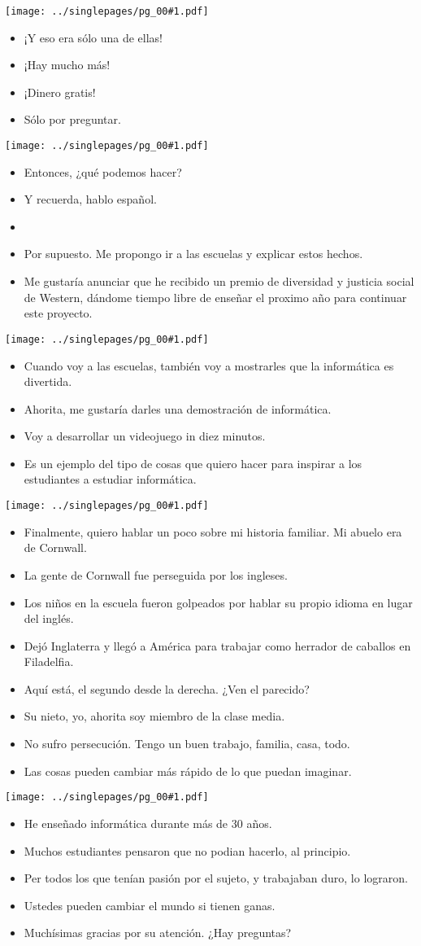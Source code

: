 \documentclass[12pt]{article}
\newcommand{\bi}{\begin{itemize}}
\newcommand{\ei}{\end{itemize}}
\newcommand{\cue}{\mbox{}
  \fbox{\sf Next slide}
}
\newcommand{\fig}[1]{
  \newpage  
  \begin{center}
    \texttt{[image: ../singlepages/pg\_00\#1.pdf]}
  \end{center}
  
}
\begin{document}
\fig{18}

\bi
\item
  ¡Y eso era sólo una de ellas!
\item
  ¡Hay mucho más!
\item
  ¡Dinero gratis!
\item
  Sólo por preguntar.
  \ei
  
\fig{20}

\bi
\item
Entonces, ¿qué podemos hacer?
\item
Y recuerda, hablo español.
\item \cue
\item Por supuesto.  Me propongo ir a las escuelas y explicar estos hechos. 
\item
Me gustaría anunciar que he recibido un premio de diversidad y
justicia social de Western, dándome tiempo libre de enseñar el proximo
año para continuar este proyecto.
\ei

\fig{21}
\bi
\item Cuando voy a las escuelas, también voy a mostrarles que la
  informática es divertida.
\item
Ahorita, me gustaría darles una demostración de informática.
\item
Voy a desarrollar un videojuego in diez minutos.
\item
Es un ejemplo del tipo de cosas que quiero hacer para inspirar a los
estudiantes a estudiar informática.
\ei

\fig{22}
\bi
\item
Finalmente, quiero hablar un poco sobre mi historia familiar.  Mi
abuelo era de Cornwall.
\item
  La gente de Cornwall fue perseguida por los
  ingleses.
\item Los niños en la escuela fueron golpeados por hablar su
  propio idioma en lugar del inglés.
\item
  Dejó Inglaterra y llegó a América
  para trabajar como herrador de caballos en Filadelfia.
\item   Aquí está, el segundo desde la derecha.
 ¿Ven el parecido?
\item
  Su nieto, yo,
  ahorita soy miembro de la clase media.
\item
  No sufro persecución.
Tengo
  un buen trabajo, familia, casa, todo.
\item
  Las cosas pueden cambiar más
rápido de lo que puedan imaginar.
\ei

\fig{23}
\bi
\item He enseñado informática durante más de 30 años.
\item Muchos estudiantes pensaron que no podian hacerlo, al principio.
\item Per todos los que tenían pasión por el sujeto, y trabajaban duro, 
  lo lograron.
\item Ustedes pueden cambiar el mundo si tienen ganas.
  \item Muchísimas gracias por su atención.  ¿Hay preguntas?
  \ei
\end{document}
